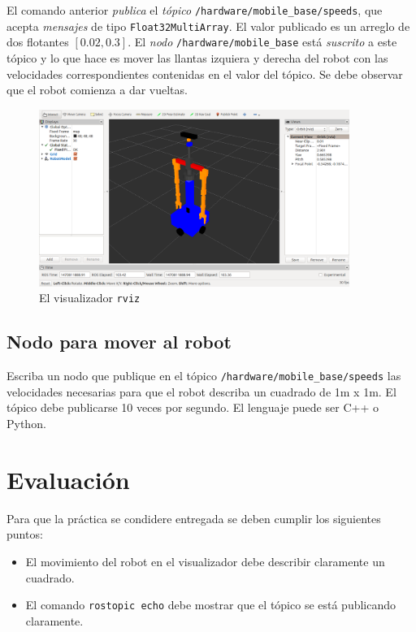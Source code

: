 \documentclass[letterpaper,12pt]{article}
\begin{document}
El comando anterior \textit{publica} el \textit{tópico} \texttt{/hardware/mobile\_base/speeds}, que acepta \textit{mensajes} de tipo \texttt{Float32MultiArray}. El valor publicado es un arreglo de dos flotantes $[0.02, 0.3]$. El \textit{nodo} \texttt{/hardware/mobile\_base} está \textit{suscrito} a este tópico y lo que hace es mover las llantas izquiera y derecha del robot con las velocidades correspondientes contenidas en el valor del tópico. Se debe observar que el robot comienza a dar vueltas. 

\begin{figure}
\centering
\includegraphics[width=0.9\textwidth]{rviz_initial.png}
\caption{El visualizador \texttt{rviz}}
\label{fig:rviz}
\end{figure}

\subsection{Nodo para mover al robot}
Escriba un nodo que publique en el tópico \texttt{/hardware/mobile\_base/speeds} las velocidades necesarias para que el robot describa un cuadrado de 1m x 1m. El tópico debe publicarse 10 veces por segundo. El lenguaje puede ser C++ o Python.

\section{Evaluación}
Para que la práctica se condidere entregada se deben cumplir los siguientes puntos:
\begin{itemize}
\item El movimiento del robot en el visualizador debe describir claramente un cuadrado.
\item El comando \texttt{rostopic echo} debe mostrar que el tópico se está publicando claramente.
\end{itemize}
\end{document}
